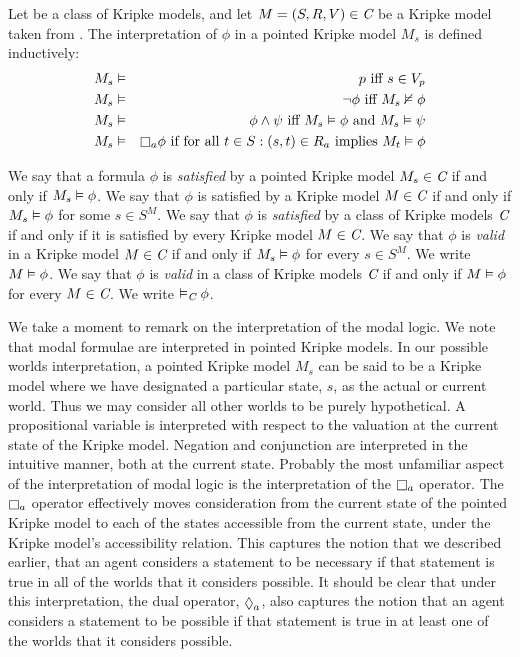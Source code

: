 \begin{definition}
Let \classC{} be a class of Kripke models, and let $M = (S, R, V) \in \textit{C}$
be a Kripke model taken from \classC{}. The interpretation of $\phi$ in a
pointed Kripke model $M_s$ is defined inductively:
\begin{eqnarray*}
M_s &\entails& p \text{ iff } s \in V_p\\
M_s &\entails& \neg \phi \text{ iff } M_s \nentails \phi\\
M_s &\entails& \phi \land \psi \text{ iff } M_s \entails \phi \text{ and } M_s
\entails \psi\\
M_s &\entails& \knows_a \phi \text{ if for all } t \in S : (s, t) \in R_a \text{
implies } M_t \entails \phi
\end{eqnarray*}
\end{definition}

We say that a formula $\phi$ is {\em satisfied} by a pointed Kripke model $M_s
\in \textit{C}$ if and only if $M_s \vDash \phi$. We say that $\phi$ is satisfied
by a Kripke model $M \in \textit{C}$ if and only if $M_s \vDash \phi$ for some $s
\in S^M$. We say that $\phi$ is {\em satisfied} by a class of Kripke models
$\textit{C}$ if and only if it is satisfied by every Kripke model $M \in \textit{C}$.
We say that $\phi$ is {\em valid} in a Kripke model $M \in \textit{C}$ if and only
if $M_s \vDash \phi$ for every $s \in S^M$. We write $M \vDash \phi$. We say
that $\phi$ is {\em valid} in a class of Kripke models $\textit{C}$ if and only if
$M \vDash \phi$ for every $M \in \textit{C}$. We write $\vDash_{\textit{C}} \phi$.

We take a moment to remark on the interpretation of the modal logic. We note
that modal formulae are interpreted in pointed Kripke models. In our possible
worlds interpretation, a pointed Kripke model $M_s$ can be said to be a Kripke
model where we have designated a particular state, $s$, as the actual or current
world. Thus we may consider all other worlds to be purely hypothetical. A
propositional variable is interpreted with respect to the valuation at the
current state of the Kripke model. Negation and conjunction are interpreted in
the intuitive manner, both at the current state. Probably the most unfamiliar
aspect of the interpretation of modal logic is the interpretation of the
$\knows_a$ operator.  The $\knows_a$ operator effectively moves consideration
from the current state of the pointed Kripke model to each of the states
accessible from the current state, under the Kripke model's accessibility
relation. This captures the notion that we described earlier, that an agent
considers a statement to be necessary if that statement is true in all of the
worlds that it considers possible. It should be clear that under this
interpretation, the dual operator, $\suspects_a$, also captures the notion that
an agent considers a statement to be possible if that statement is true in at
least one of the worlds that it considers possible.

